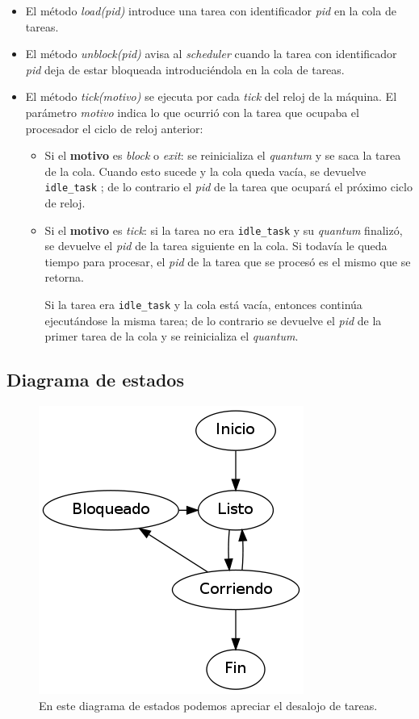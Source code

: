 \begin{itemize}
	\item El método \emph{load(pid)} introduce una tarea con identificador \emph{pid} en la cola de tareas.
	
	\item El método \emph{unblock(pid)} avisa al \emph{scheduler} cuando la tarea con identificador \emph{pid} deja de estar bloqueada introduciéndola en la cola de tareas.
	
	\item El método \emph{tick(motivo)} se ejecuta por cada \emph{tick} del reloj de la máquina. El parámetro \emph{motivo} indica lo que ocurrió con la tarea que ocupaba el procesador el ciclo de reloj anterior:
	
	\begin{itemize}
		\item Si el \textbf{motivo} es \emph{block} o \emph{exit}: se reinicializa el \emph{quantum} y se saca la tarea de la cola. Cuando esto sucede y la cola queda vacía, se devuelve \verb|idle_task| ; de lo contrario el \emph{pid} de la tarea que ocupará el próximo ciclo de reloj.

		\item Si el \textbf{motivo} es \emph{tick}: si la tarea no era \verb|idle_task| y su \textit{quantum} finalizó, se devuelve el \emph{pid} de la tarea siguiente en la cola. Si todavía le queda tiempo para procesar, el \emph{pid} de la tarea que se procesó es el mismo que se retorna.
		
		Si la tarea era \verb|idle_task| y la cola está vacía, entonces continúa ejecutándose la misma tarea; de lo contrario se devuelve el \emph{pid} de la primer tarea de la cola y se reinicializa el \emph{quantum}.
	\end{itemize}

\end{itemize}

\subsection{Diagrama de estados}

\begin{figure}[H]
\centering
\includegraphics[scale=0.5]{estados.png}
\caption{En este diagrama de estados podemos apreciar el desalojo de tareas.}
\end{figure}

